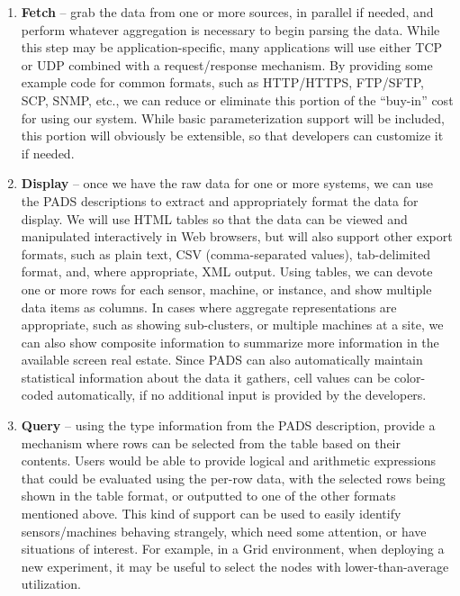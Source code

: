 \begin{enumerate}

\item {\bf Fetch} -- grab the data from one or more sources, in parallel if
needed, and perform whatever aggregation is necessary to begin parsing
the data. While this step may be application-specific, many
applications will use either TCP or UDP combined with a
request/response mechanism. By providing some example code for common
formats, such as HTTP/HTTPS, FTP/SFTP, SCP, SNMP, etc., we can reduce
or eliminate this portion of the ``buy-in'' cost for using our system.
While basic parameterization support will be included, this portion
will obviously be extensible, so that developers can customize it if
needed.

\item {\bf Display} -- once we have the raw data for one or more systems, we
can use the PADS descriptions to extract and appropriately format the
data for display. We will use HTML tables so that the data can be
viewed and manipulated interactively in Web browsers, but will also
support other export formats, such as plain text, CSV (comma-separated
values), tab-delimited format, and, where appropriate, XML
output. Using tables, we can devote one or more rows for each sensor,
machine, or instance, and show multiple data items as columns. In
cases where aggregate representations are appropriate, such as showing
sub-clusters, or multiple machines at a site, we can also show
composite information to summarize more information in the available
screen real estate. Since PADS can also automatically maintain
statistical information about the data it gathers, cell values can be
color-coded automatically, if no additional input is provided by the
developers.

\item {\bf Query} -- using the type information from the PADS description,
provide a mechanism where rows can be selected from the table based on
their contents. Users would be able to provide logical and arithmetic
expressions that could be evaluated using the per-row data, with the
selected rows being shown in the table format, or outputted to one of
the other formats mentioned above. This kind of support can be used to
easily identify sensors/machines behaving strangely, which need some
attention, or have situations of interest. For example, in a Grid
environment, when deploying a new experiment, it may be useful to
select the nodes with lower-than-average utilization.


\end{enumerate}
